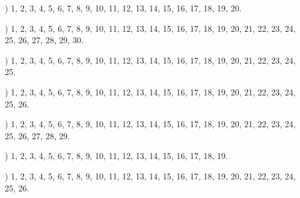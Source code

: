 \documentclass[a4paper,11pt]{article}
\begin{document}
\vspace{\spaceTwo}












\noindent
{}) 1, 2, 3, 4, 5, 6, 7, 8, 9, 10, 11, 12, 13, 14, 15, 16,
17, 18, 19, 20.

\vspace{\spaceFour}



\noindent
{}) 1, 2, 3, 4, 5, 6, 7, 8, 9, 10, 11, 12, 13, 14, 15, 16,
17, 18, 19, 20, 21, 22, 23, 24, 25, 26, 27, 28, 29, 30.

\vspace{\spaceFour}



\noindent
{}) 1, 2, 3, 4, 5, 6, 7, 8, 9, 10, 11, 12, 13, 14, 15, 16,
17, 18, 19, 20, 21, 22, 23, 24, 25.

\vspace{\spaceFour}



\noindent
{}) 1, 2, 3, 4, 5, 6, 7, 8, 9, 10, 11, 12, 13, 14, 15, 16,
17, 18, 19, 20, 21, 22, 23, 24, 25, 26.

\vspace{\spaceFour}



\noindent
{}) 1, 2, 3, 4, 5, 6, 7, 8, 9, 10, 11, 12, 13, 14, 15, 16,
17, 18, 19, 20, 21, 22, 23, 24, 25, 26, 27, 28, 29.

\vspace{\spaceFour}



\noindent
{}) 1, 2, 3, 4, 5, 6, 7, 8, 9, 10, 11, 12, 13, 14, 15, 16,
17, 18, 19.

\vspace{\spaceFour}



\noindent
{}) 1, 2, 3, 4, 5, 6, 7, 8, 9, 10, 11, 12, 13, 14, 15, 16,
17, 18, 19, 20, 21, 22, 23, 24, 25, 26.

\vspace{\spaceFour}
\end{document}
